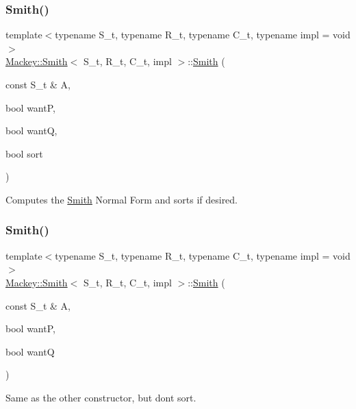 \subsubsection{\texorpdfstring{Smith()}{Smith()}\hspace{0.1cm}{\footnotesize\ttfamily [1/2]}}
{\footnotesize\ttfamily template$<$typename S\+\_\+t, typename R\+\_\+t, typename C\+\_\+t, typename impl = void$>$ \\
\hyperlink{classMackey_1_1Smith}{Mackey\+::\+Smith}$<$ S\+\_\+t, R\+\_\+t, C\+\_\+t, impl $>$\+::\hyperlink{classMackey_1_1Smith}{Smith} (\begin{DoxyParamCaption}\item[{const S\+\_\+t \&}]{A,  }\item[{bool}]{wantP,  }\item[{bool}]{wantQ,  }\item[{bool}]{sort }\end{DoxyParamCaption})\hspace{0.3cm}{\ttfamily [inline]}}



Computes the \hyperlink{classMackey_1_1Smith}{Smith} Normal Form and sorts if desired. 

\mbox{\label{classMackey_1_1Smith_a612e73ee01325c7adf0b7102d007a915}} 
\subsubsection{\texorpdfstring{Smith()}{Smith()}\hspace{0.1cm}{\footnotesize\ttfamily [2/2]}}
{\footnotesize\ttfamily template$<$typename S\+\_\+t, typename R\+\_\+t, typename C\+\_\+t, typename impl = void$>$ \\
\hyperlink{classMackey_1_1Smith}{Mackey\+::\+Smith}$<$ S\+\_\+t, R\+\_\+t, C\+\_\+t, impl $>$\+::\hyperlink{classMackey_1_1Smith}{Smith} (\begin{DoxyParamCaption}\item[{const S\+\_\+t \&}]{A,  }\item[{bool}]{wantP,  }\item[{bool}]{wantQ }\end{DoxyParamCaption})\hspace{0.3cm}{\ttfamily [inline]}}



Same as the other constructor, but don\textquotesingle{}t sort. 

